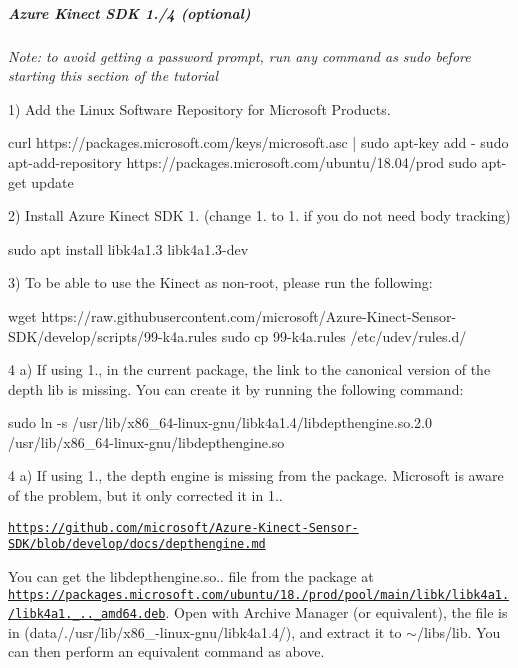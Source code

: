 \subparagraph*{Azure Kinect S\+DK 1./4 (optional)}

{\itshape Note\+: to avoid getting a password prompt, run any command as sudo before starting this section of the tutorial}

1) Add the Linux Software Repository for Microsoft Products. 
\begin{DoxyCode}
curl https://packages.microsoft.com/keys/microsoft.asc | sudo apt-key add -
sudo apt-add-repository https://packages.microsoft.com/ubuntu/18.04/prod
sudo apt-get update
\end{DoxyCode}


2) Install Azure Kinect S\+DK 1. (change 1. to 1. if you do not need body tracking) 
\begin{DoxyCode}
sudo apt install libk4a1.3 libk4a1.3-dev
\end{DoxyCode}


3) To be able to use the Kinect as non-\/root, please run the following\+: 
\begin{DoxyCode}
wget https://raw.githubusercontent.com/microsoft/Azure-Kinect-Sensor-SDK/develop/scripts/99-k4a.rules
sudo cp 99-k4a.rules /etc/udev/rules.d/
\end{DoxyCode}


4 a) If using 1., in the current package, the link to the canonical version of the depth lib is missing. You can create it by running the following command\+:


\begin{DoxyCode}
sudo ln -s /usr/lib/x86\_64-linux-gnu/libk4a1.4/libdepthengine.so.2.0
       /usr/lib/x86\_64-linux-gnu/libdepthengine.so
\end{DoxyCode}


4 a) If using 1., the depth engine is missing from the package. Microsoft is aware of the problem, but it only corrected it in 1..

\href{https://github.com/microsoft/Azure-Kinect-Sensor-SDK/blob/develop/docs/depthengine.md}{\tt https\+://github.\+com/microsoft/\+Azure-\/\+Kinect-\/\+Sensor-\/\+S\+D\+K/blob/develop/docs/depthengine.\+md}

You can get the libdepthengine.\+so.. file from the package at \href{https://packages.microsoft.com/ubuntu/18.04/prod/pool/main/libk/libk4a1.4/libk4a1.4_1.4.1_amd64.deb}{\tt https\+://packages.\+microsoft.\+com/ubuntu/18./prod/pool/main/libk/libk4a1./libk4a1.\+\_..\+\_\+amd64.\+deb}. Open with Archive Manager (or equivalent), the file is in (data/./usr/lib/x86\+\_-\/linux-\/gnu/libk4a1.4/), and extract it to {\ttfamily $\sim$/libs/lib}. You can then perform an equivalent command as above.


